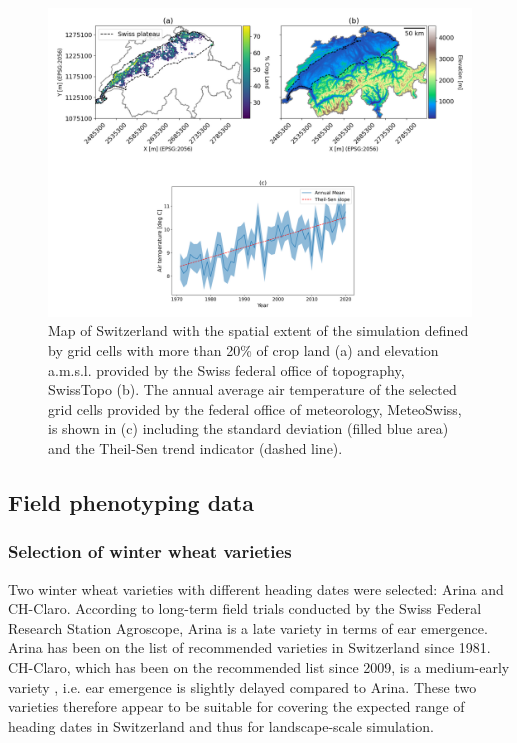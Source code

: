 \begin{figure}[H]
    \centering
    \includegraphics[width=\textwidth]{03-Heading-Dates/img/figure_study_area.png}
    \caption{Map of Switzerland with the spatial extent of the simulation defined by grid cells with more than 20\% of crop land (a) and elevation a.m.s.l. provided by the Swiss federal office of topography, SwissTopo (b). The annual average air temperature of the selected grid cells provided by the federal office of meteorology, MeteoSwiss, is shown in (c) including the standard deviation (filled blue area) and the Theil-Sen trend indicator (dashed line).}
    \label{fig:map-spatial-units}
\end{figure}

\subsection{Field phenotyping data}
\subsubsection{Selection of winter wheat varieties}
\label{subsubsec:varieties}
Two winter wheat varieties with different heading dates were selected: Arina and CH-Claro. According to long-term field trials conducted by the Swiss Federal Research Station Agroscope, Arina is a late variety in terms of ear emergence. Arina has been on the list of recommended varieties in Switzerland since 1981. CH-Claro, which has been on the recommended list since 2009, is a medium-early variety \citep{strebel_liste_2023}, i.e. ear emergence is slightly delayed compared to Arina. These two varieties therefore appear to be suitable for covering the expected range of heading dates in Switzerland and thus for landscape-scale simulation.

